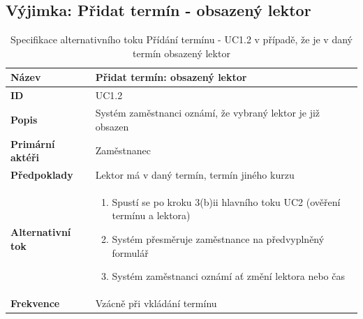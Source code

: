 \documentclass[12pt,a4paper,titlepage,final]{report}
\begin{document}
\subsection{Výjimka: Přidat termín - obsazený lektor}
\begin{table}[!h]	
	\begin{center}
    \begin{tabular}{ | p{4.2cm} | p{12.2cm} | }
    \hline
    \textbf{Název} & Přidat termín: obsazený lektor
    \\ \hline
    
	\textbf{ID} & UC1.2
	\\ \hline
	
	\textbf{Popis} & Systém zaměstnanci oznámí, že vybraný lektor je již obsazen
	\\ \hline
	    
	\textbf{Primární aktéři} & Zaměstnanec
	\\ \hline
	
	\textbf{Předpoklady} & Lektor má v daný termín, termín jiného kurzu
    \\ \hline
    
    \textbf{Alternativní tok} & 
	    \vspace{-3.5mm}
    	\begin{enumerate}
   	        \itemsep0em 
    		\item Spustí se po kroku 3(b)ii hlavního toku UC2 (ověření termínu a lektora)
	    	\item Systém přesměruje zaměstnance na předvyplněný formulář
	    	\item Systém zaměstnanci oznámí ať změní lektora nebo čas
    	\end{enumerate}
    \\ \hline 

	\textbf{Frekvence} & Vzácně při vkládání termínu
	\\ \hline
	\end{tabular}	
	\caption{Specifikace alternativního toku Přídání termínu - UC1.2 v případě, že je v daný termín obsazený lektor}	
	\end{center}
\end{table}

\newpage
\end{document}
